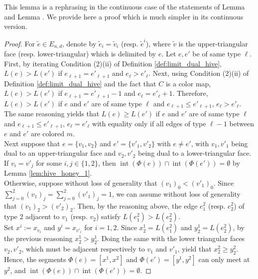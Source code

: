 \documentclass[11pt,a4paper]{amsart}
\DeclareMathOperator{\interior}{int}
\numberwithin{equation}{section}
\theoremstyle{definition}
\begin{document}
\noindent
This lemma is a rephrasing in the continuous case of the statements 
of Lemma \cite[5.9]{françois2024positiveformulaproductconjugacy} 
and Lemma \cite[5.10]{françois2024positiveformulaproductconjugacy}. 
We provide here a proof which is much simpler in its continuous version.

\begin{proof}
For $\tilde{e}\in E_{n,d}$, denote by $\tilde{e}_i=\tilde{v}_i$ (resp. $\tilde{e}^i$), 
where $\tilde{v}$ is the upper-triangular face (resp. lower-triangular) 
which is delimited by $e$.
Let $e,e'$ be of same type $\ell$. First, by iterating Condition (2)(ii) 
of Definition \ref{def:limit_dual_hive}, $L(e)>L(e')$ if $e_{\ell+1}=e'_{\ell+1}$ 
and $e_{\ell}>e'_{\ell}$. Next, using Condition (2)(ii) of 
Definition \ref{def:limit_dual_hive} and the fact that $C$ is a color map, 
$L(e)>L(e')$ if $e_{\ell+1}=e'_{\ell+1}-1$ and $e_{\ell}=e'_{\ell}+1$. 
Therefore, $L(e)>L(e')$ if $e$ and $e'$ are of same type $\ell$ and 
$e_{\ell+1}\leqslant e'_{\ell+1}$, $e_{\ell}>e'_{\ell}$. 
The same reasoning yields that $L(e)\geqslant L(e')$ if $e$ and $e'$ are of same 
type $\ell$ and $e_{\ell+1}\leqslant e'_{\ell+1}$, $e_{\ell}=e'_{\ell}$ 
with equality only if all edges of type $\ell-1$ between $e$ and $e'$ 
are colored $m$.
\\
Next suppose that $e=\{v_1,v_2\}$ and $e'=\{v'_1,v'_2\}$ with $e\not =e'$, 
with $v_1,v'_1$ being dual to an upper-triangular face and $v_2,v'_2$ being 
dual to a lower-triangular face. If $v_i=v'_j$ for some $i,j\in\{1,2\}$, 
then $\interior(\Phi(e))\cap \interior(\Phi(e'))=\emptyset$ by Lemma \ref{lem:hive_honey_1}. 
\\
Otherwise, suppose without loss of generality that $(v_1)_0<(v'_1)_0$. 
Since $\sum_{j=0}^2(v_1)_j= \sum_{j=0}^2(v'_1)_j=1$, we can assume without loss 
of generality that $(v_1)_2>(v'_2)_2$. Then, by the reasoning above, 
the edge $e^2_1$ (resp. $e^2_2$) of type $2$ adjacent to $v_1$ (resp. $v_2$) 
satisfy $L(e^2_1)>L(e^2_2)$.
\\
Set $x^i:=x_{v_i}$ and $y^i=x_{v'_i}$ for $i=1,2$. 
Since $x^1_2=L(e^2_1)$ and $y^1_2=L(e^2_2)$, by the previous reasoning 
$x^1_2>y^1_2$. Doing the same with the lower triangular faces $v_2,v'_2$, 
which must be adjacent respectively to $v_1$ and $v'_1$, yield that 
$x^2_2\geqslant y^2_2$. Hence, the segments $\Phi(e)=[x^1,x^2]$ and 
$\Phi(e')=[y^1,y^2]$ can only meet at $y^2$, and $\interior(\Phi(e))\cap \interior(\Phi(e'))=\emptyset$. 
\end{proof}
\end{document}
